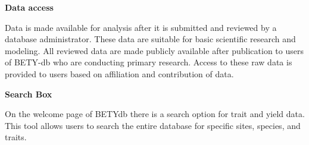 \textbf{Data access}

Data is made available for analysis after it is submitted and reviewed by a database administrator. These data are suitable for basic scientific research and modeling. All reviewed data are made publicly available after publication to users of BETY-db who are conducting primary research. Access to these raw data is provided to users based on affiliation and contribution of data.

\textbf{ Search Box}

On the welcome page of BETYdb there is a search option for trait and yield data. This tool allows users to search the entire database for specific sites, species, and traits.